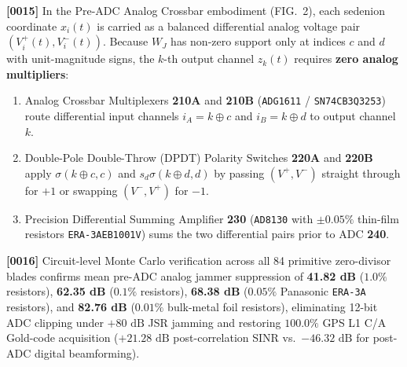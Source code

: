 \documentclass[12pt,letterpaper]{article}
\begin{document}
\textbf{[0015]} In the Pre-ADC Analog Crossbar embodiment (FIG.\ 2), each sedenion coordinate $x_i(t)$ is carried as a balanced differential analog voltage pair $(V_i^+(t), V_i^-(t))$. Because $W_J$ has non-zero support only at indices $c$ and $d$ with unit-magnitude signs, the $k$-th output channel $z_k(t)$ requires \textbf{zero analog multipliers}:
\begin{enumerate}[leftmargin=18pt,itemsep=1pt]
    \item Analog Crossbar Multiplexers \textbf{210A} and \textbf{210B} (\texttt{ADG1611} / \texttt{SN74CB3Q3253}) route differential input channels $i_A = k \oplus c$ and $i_B = k \oplus d$ to output channel $k$.
    \item Double-Pole Double-Throw (DPDT) Polarity Switches \textbf{220A} and \textbf{220B} apply $\sigma(k \oplus c, c)$ and $s_d \sigma(k \oplus d, d)$ by passing $(V^+, V^-)$ straight through for $+1$ or swapping $(V^-, V^+)$ for $-1$.
    \item Precision Differential Summing Amplifier \textbf{230} (\texttt{AD8130} with $\pm 0.05\%$ thin-film resistors \texttt{ERA-3AEB1001V}) sums the two differential pairs prior to ADC \textbf{240}.
\end{enumerate}
\textbf{[0016]} Circuit-level Monte Carlo verification across all 84 primitive zero-divisor blades confirms mean pre-ADC analog jammer suppression of \textbf{41.82 dB} ($1.0\%$ resistors), \textbf{62.35 dB} ($0.1\%$ resistors), \textbf{68.38 dB} ($0.05\%$ Panasonic \texttt{ERA-3A} resistors), and \textbf{82.76 dB} ($0.01\%$ bulk-metal foil resistors), eliminating 12-bit ADC clipping under $+80\text{ dB}$ JSR jamming and restoring $100.0\%$ GPS L1 C/A Gold-code acquisition ($+21.28\text{ dB}$ post-correlation SINR vs.\ $-46.32\text{ dB}$ for post-ADC digital beamforming).
\end{document}

